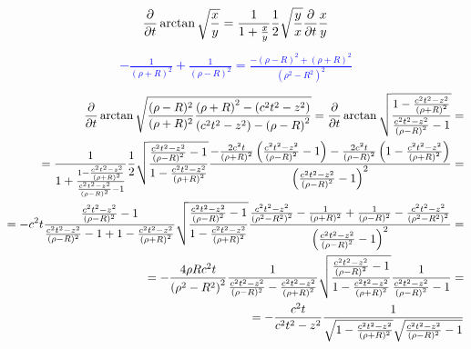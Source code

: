 %
\textcolor{blue}{ \begin{equation*} \begin{aligned}
\frac{\partial }{\partial t} \arctan \sqrt{ \frac{x}{y} } = 
\frac{1}{1 + \frac{x}{y}} \frac{1}{2} 
\sqrt \frac{y}{x} \frac{\partial }{\partial t} \frac{x}{y}
\end{aligned} \end{equation*} }
%
\textcolor{blue}{ \begin{equation*} \begin{aligned}
- \frac{1}{(\rho + R)^2} + \frac{1}{(\rho - R)^2} = 
\frac{- (\rho-R)^2 + (\rho+R)^2 }{ (\rho^2 - R^2)^2 }
\end{aligned} \end{equation*} }
%
\textcolor{blue}{ \begin{equation*} \begin{aligned}
\frac{\partial }{\partial t} \arctan \sqrt{ \frac{(\rho - R)^2}{(\rho + R)^2}
\frac{\left( \rho + R \right)^2 - \left( c^2t^2 - z^2 \right)} 
{\left( c^2t^2 - z^2 \right) - \left( \rho - R \right)^2} } = 
\frac{\partial }{\partial t} \arctan \sqrt{ \frac
{1 - \frac{c^2t^2 - z^2}{\left( \rho + R \right)^2} } 
{ \frac{c^2t^2 - z^2}{ \left( \rho - R \right)^2 } - 1} } = \\
= \frac{1}{1 + \frac{1 - \frac{c^2t^2 - z^2}{\left( \rho + R \right)^2} } 
{ \frac{c^2t^2 - z^2}{ \left( \rho - R \right)^2 } - 1} } \frac{1}{2}
\sqrt{ \frac{ \frac{c^2t^2 - z^2}{ \left( \rho - R \right)^2 } - 1 }
{1 - \frac{c^2t^2 - z^2}{\left( \rho + R \right)^2} } } 
\frac{ - \frac{2 c^2 t}{\left( \rho + R \right)^2} 
\left( \frac{c^2t^2 - z^2}{ \left( \rho - R \right)^2} - 1 \right) - 
\frac{ 2 c^2 t }{ \left( \rho - R \right)^2 } 
\left( 1 - \frac{c^2t^2 - z^2}{\left( \rho + R \right)^2} \right) }
{\left( \frac{c^2t^2 - z^2}{ \left( \rho - R \right)^2 } - 1 \right)^2} = \\
= - c^2 t \frac{ \frac{c^2t^2-z^2}{(\rho-R)^2} - 1 }
{ \frac{c^2t^2-z^2}{(\rho-R)^2} - 1 + 1 - 
\frac{c^2t^2 - z^2}{\left( \rho + R \right)^2} }
\sqrt{ \frac{ \frac{c^2t^2 - z^2}{ \left( \rho - R \right)^2 } - 1}
{1 - \frac{c^2t^2 - z^2}{\left( \rho + R \right)^2} } } \frac
{ \frac{c^2t^2 - z^2}{ \left( \rho^2 - R^2 \right)^2 } - \frac{1}{(\rho+R)^2} + 
\frac{1}{(\rho-R)^2} - \frac{ c^2t^2 - z^2 }{ \left( \rho^2 - R^2 \right)^2 } }
{ \left( \frac{c^2t^2 - z^2}{ \left( \rho - R \right)^2} - 1 \right)^2 } = \\
= - \frac{4 \rho R c^2 t}{ \left( \rho^2 - R^2 \right)^2 } 
\frac{ 1 }{ \frac{c^2t^2-z^2}{(\rho-R)^2} - 
\frac{c^2t^2 - z^2}{\left( \rho + R \right)^2} }
\sqrt{ \frac{ \frac{c^2t^2 - z^2}{ \left( \rho - R \right)^2 } - 1}
{1 - \frac{c^2t^2 - z^2}{\left( \rho + R \right)^2} } } \frac
{ 1 }{ \frac{c^2t^2 - z^2}{ \left( \rho - R \right)^2} - 1 } = \\
= - \frac{c^2 t}{ c^2 t^2 - z^2 } \frac{1} { 
\sqrt{ 1 - \frac{c^2t^2 - z^2}{(\rho + R)^2 } } 
\sqrt{ \frac{c^2t^2 - z^2}{ (\rho - R)^2 } - 1} }
\end{aligned} \end{equation*} }
